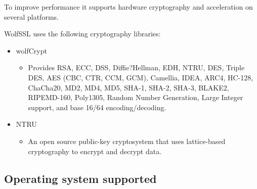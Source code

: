 \documentclass[a4paper,12pt]{article}
\begin{document}
To improve performance it supports hardware cryptography and acceleration on several platforms.

WolfSSL uses the following cryptography libraries:
\begin{itemize}
\item wolfCrypt
\begin{itemize}
\item Provides RSA, ECC, DSS, Diffie?Hellman, EDH, NTRU, DES, Triple DES, AES (CBC, CTR, CCM, GCM), Camellia, IDEA, ARC4, HC-128, ChaCha20, MD2, MD4, MD5, SHA-1, SHA-2, SHA-3, BLAKE2, RIPEMD-160, Poly1305, Random Number Generation, Large Integer support, and base 16/64 encoding/decoding.
\end{itemize}
\item NTRU
\begin{itemize}
\item An open source public-key cryptosystem that uses lattice-based cryptography to encrypt and decrypt data. 
\end{itemize}
\end{itemize}

\cleardoublepage
\subsection{Operating system supported}
\end{document}
